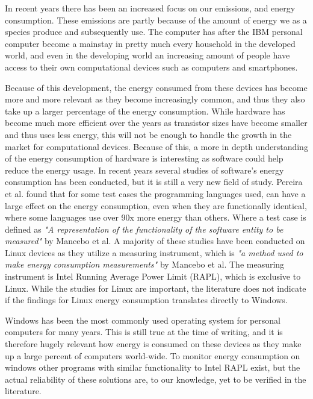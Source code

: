 In recent years there has been an increased focus on our emissions, and energy consumption. These emissions are partly because of the amount of energy we as a species produce and subsequently use. 
The computer has after the IBM personal computer become a mainstay in pretty much every household in the developed world, and even in the developing world an increasing amount of people have access to their own computational devices such as computers and smartphones\cite{DevelopedWorldPC}. 

Because of this development, the energy consumed from these devices has become more and more relevant as they become increasingly common, and thus they also take up a larger percentage of the energy consumption. 
While hardware has become much more efficient over the years as transistor sizes have become smaller and thus uses less energy, this will not be enough to handle the growth in the market for computational devices. Because of this, a more in depth understanding of the energy consumption of hardware is interesting as software could help reduce the energy usage\cite{somavat2011energy}. 
In recent years several studies of software's energy consumption has been conducted, but it is still a very new field of study. Pereira et al.\cite*{Pereira2017} found that for some test cases the programming languages used, can have a large effect on the energy consumption, even when they are functionally identical, where some languages use over 90x more energy than others. Where a test case is defined as \textit{"A representation of the functionality of the software entity to be measured"} by Mancebo et al.\cite*{MANCEBO2021100558}
A majority of these studies have been conducted on Linux devices as they utilize a measuring instrument, which is \textit{"a method used to make energy consumption measurements"} by Mancebo et al.\cite*{MANCEBO2021100558} The measuring instrument is Intel Running Average Power Limit (RAPL), which is exclusive to Linux. While the studies for Linux are important, the literature does not indicate if the findings for Linux energy consumption translates directly to Windows\cite{Pereira2017}. 

Windows has been the most commonly used operating system for personal computers for many years. This is still true at the time of writing, and it is therefore hugely relevant how energy is consumed on these devices as they make up a large percent of computers world-wide\cite{OSShare}. To monitor energy consumption on windows other programs with similar functionality to Intel RAPL exist, but the actual reliability of these solutions are, to our knowledge, yet to be verified in the literature.

